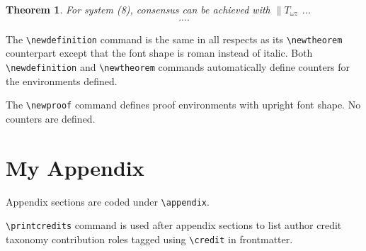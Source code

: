 \documentclass[a4paper,fleqn]{cas-dc}
\begin{document}
\newtheorem{theorem}{Theorem}

\begin{theorem}
For system (8), consensus can be achieved with 
$\|T_{\omega z}$ ...
\begin{eqnarray}\label{10}
....
\end{eqnarray}
\end{theorem}

The \verb+\newdefinition+ command is the same in
all respects as its \verb+\newtheorem+ counterpart except that
the font shape is roman instead of italic.  Both
\verb+\newdefinition+ and \verb+\newtheorem+ commands
automatically define counters for the environments defined.

The \verb+\newproof+ command defines proof environments with
upright font shape.  No counters are defined. 



\appendix
\section{My Appendix}
Appendix sections are coded under \verb+\appendix+.

\verb+\printcredits+ command is used after appendix sections to list 
author credit taxonomy contribution roles tagged using \verb+\credit+ 
in frontmatter.


%


%




%
%
\end{document}
